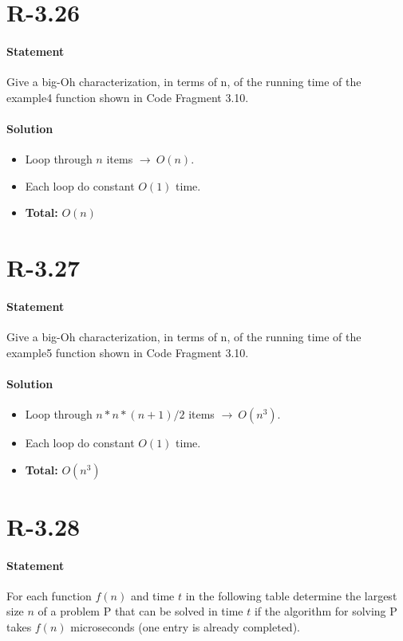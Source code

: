 \documentclass{article}
\begin{document}
\section{R-3.26}
\paragraph{Statement}
Give a big-Oh characterization, in terms of n, of the running time of the example4 function shown in Code Fragment 3.10.
\paragraph{Solution}
  \begin{itemize}
    \item Loop through $n$ items $\rightarrow \ O(n)$.
    \item Each loop do constant $O(1)$ time.
    \item \textbf{Total:} $O(n)$
  \end{itemize}
\section{R-3.27}
\paragraph{Statement}
Give a big-Oh characterization, in terms of n, of the running time of the example5 function shown in Code Fragment 3.10.
\paragraph{Solution}
  \begin{itemize}
    \item Loop through $n*n*(n+1)/2$ items $\rightarrow \ O(n^3)$.
    \item Each loop do constant $O(1)$ time.
    \item \textbf{Total:} $O(n^3)$
  \end{itemize}

\newpage
\section{R-3.28}
\paragraph{Statement}
For each function $f (n)$ and time $t$ in the following table determine the largest size $n$ of a problem P that can be solved in time $t$ if the algorithm for solving P takes $f (n) $ microseconds (one entry is already completed).
\end{document}
